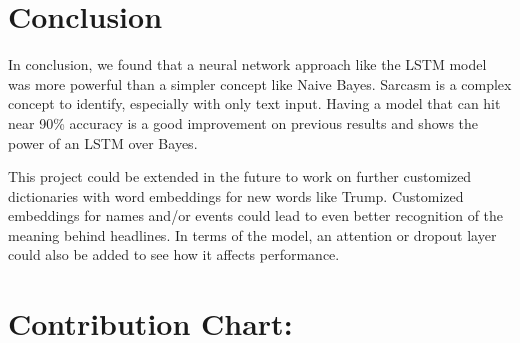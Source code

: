 \documentclass[11pt]{article}
\begin{document}



\section{Conclusion}

In conclusion, we found that a neural network approach like the LSTM model was more powerful than a simpler concept like Naive Bayes. Sarcasm is a complex concept to identify, especially with only text input. Having a model that can hit near 90\% accuracy is a good improvement on previous results and shows the power of an LSTM over Bayes.

This project could be extended in the future to work on further customized dictionaries with word embeddings for new words like Trump. Customized embeddings for names and/or events could lead to even better recognition of the meaning behind headlines. In terms of the model, an attention or dropout layer could also be added to see how it affects performance.

\section{Contribution Chart:}
\end{document}

